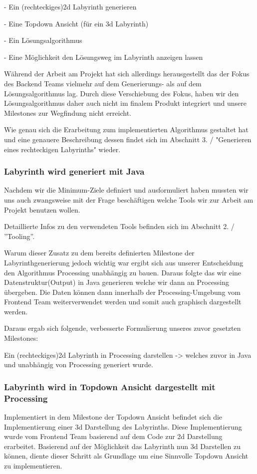 	- Ein (rechteckiges)2d Labyrinth generieren
	
	- Eine Topdown Ansicht (für ein 3d Labyrinth)
		
	- Ein Lösungsalgorithmus
	
	- Eine Möglichkeit den Lösungsweg im Labyrinth anzeigen lassen
		
	Während der Arbeit am Projekt hat sich allerdings herausgestellt das der Fokus des Backend Teams vielmehr auf dem Generierungs- als auf dem Lösungsalgorithmus lag. Durch diese Verschiebung des Fokus, haben wir den Lösungsalgorithmus daher auch nicht im finalem Produkt integriert und unsere Milestones zur Wegfindung nicht erreicht.
	
	Wie genau sich die Erarbeitung zum implementierten Algorithmus gestaltet hat und eine genauere Beschreibung dessen findet sich im Abschnitt 3. / "Generieren eines rechteckigen Labyrinths" wieder.

    \subsubsection*{Labyrinth wird generiert mit Java}
		Nachdem wir die Minimum-Ziele definiert und ausformuliert haben mussten wir uns auch zwangsweise mit der Frage beschäftigen welche Tools wir zur Arbeit am Projekt benutzen wollen.
		
		Detaillierte Infos zu den verwendeten Tools befinden sich im Abschnitt 2. / ''Tooling''.
		
		Warum dieser Zusatz zu dem bereits definierten Milestone der Labyrinthgenerierung jedoch wichtig war ergibt sich aus unserer Entscheidung den Algorithmus Processing unabhängig zu bauen. Daraus folgte das wir eine Datenstruktur(Output) in Java generieren welche wir dann an Processing übergeben. Die Daten können dann innerhalb der Processing-Umgebung vom Frontend Team weiterverwendet werden und somit auch graphisch dargestellt werden.
		  
		Daraus ergab sich folgende, verbesserte Formulierung unseres zuvor gesetzten Milestones:    
		
		Ein (rechteckiges)2d Labyrinth in Processing darstellen -> welches zuvor in Java und unabhängig von Processing generiert wurde.
		
    \subsubsection*{Labyrinth wird in Topdown Ansicht dargestellt mit Processing}
    	Implementiert in dem Milestone der Topdown Ansicht befindet sich die Implementierung einer 3d Darstellung des Labyrinths. Diese Implementierung wurde vom Frontend Team basierend auf dem Code zur 2d Darstellung erarbeitet. Basierend auf der Möglichkeit das Labyrinth nun 3d Darstellen zu können, diente dieser Schritt als Grundlage um eine Sinnvolle Topdown Ansicht zu implementieren.
    	
